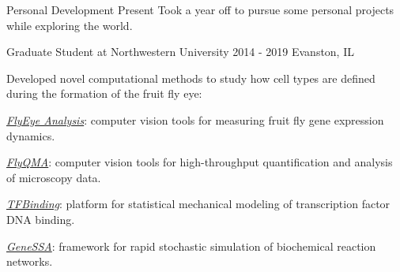 
\begin{cventries}


  \cventrynew
	{Personal Development}    
    {Present} 
    {}
    {Took a year off to pursue some personal projects while exploring the world.} 

  \cventrynew
	{Graduate Student at Northwestern University}    
    {2014 - 2019} %
    {Evanston, IL} %
    {Developed novel computational methods to study how cell types are defined during the formation of the fruit fly eye:
     \vspace{4.0mm}
      \begin{cvitems} 
         \item {\emph{\href{https://github.com/sebastianbernasek/flyeye}{FlyEye Analysis}}: computer vision tools for measuring fruit fly gene expression dynamics.}
         \item {\emph{\href{https://sebastianbernasek.github.io/flyqma/index.html}{FlyQMA}}: computer vision tools for high-throughput quantification and analysis of microscopy data.}
         \item {\emph{\href{https://github.com/sebastianbernasek/binding}{TFBinding}}: platform for statistical mechanical modeling of transcription factor DNA binding.}  
         \item {\emph{\href{https://github.com/sebastianbernasek/genessa}{GeneSSA}}: framework for rapid stochastic simulation of biochemical reaction networks.}      
      \end{cvitems}  
     \vspace{6.0mm}
}
\end{cventries}
